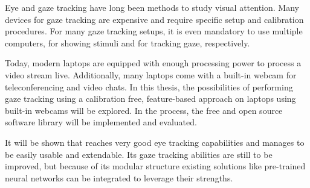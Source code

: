 Eye and gaze tracking have long been methods to study visual attention. Many
devices for gaze tracking are expensive and require specific setup and
calibration procedures. For many gaze tracking setups, it is even mandatory to
use multiple computers, for showing stimuli and for tracking gaze,
respectively.

Today, modern laptops are equipped with enough processing power to process a
video stream live. Additionally, many laptops come with a built-in webcam for
teleconferencing and video chats. In this thesis, the possibilities of
performing gaze tracking using a calibration free, feature-based approach on
laptops using built-in webcams will be explored. In the process, the free and
open source software library \Gaze{} will be implemented and evaluated.

It will be shown that \Gaze{} reaches very good eye tracking capabilities and
manages to be easily usable and extendable. Its gaze tracking abilities are
still to be improved, but because of its modular structure existing solutions
like pre-trained neural networks can be integrated to leverage their strengths.
